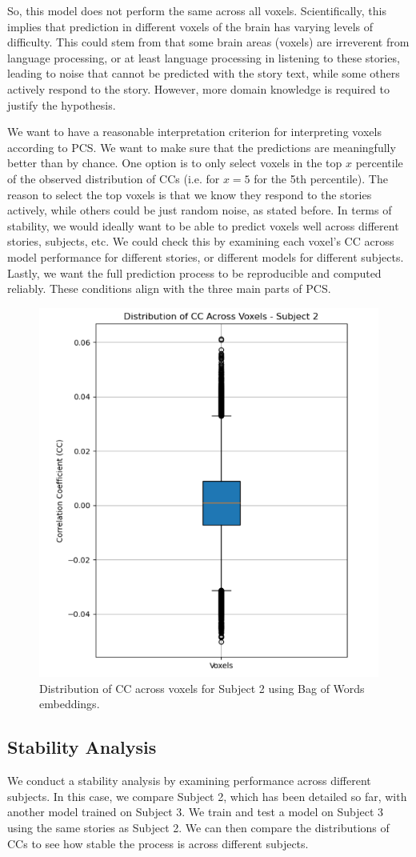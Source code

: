 \documentclass[10pt,letterpaper]{article}
\begin{document}
So, this model does not perform the same across all voxels. Scientifically, this implies that prediction in different voxels of the brain has varying levels of difficulty. This could stem from that some brain areas (voxels) are irreverent from language processing, or at least language processing in listening to these stories, leading to noise that cannot be predicted with the story text, while some others actively respond to the story. However, more domain knowledge is required to justify the hypothesis.

We want to have a reasonable interpretation criterion for interpreting voxels according to PCS. We want to make sure that the predictions are meaningfully better than by chance. One option is to only select voxels in the top \(x\) percentile of the observed distribution of CCs (i.e. for \(x=5\) for the 5th percentile). The reason to select the top voxels is that we know they respond to the stories actively, while others could be just random noise, as stated before. In terms of stability, we would ideally want to be able to predict voxels well across different stories, subjects, etc. We could check this by examining each voxel's CC across model performance for different stories, or different models for different subjects. Lastly, we want the full prediction process to be reproducible and computed reliably. These conditions align with the three main parts of PCS.


\begin{figure}
    \centering
    \includegraphics[width=0.5\linewidth]{figs/cc_dist_voxels_subject_2.png}
    \caption{Distribution of CC across voxels for Subject 2 using Bag of Words embeddings.}
    \label{fig:cc_dist_voxels_subject_2}
\end{figure}


\subsection{Stability Analysis}
We conduct a stability analysis by examining performance across different subjects. In this case, we compare Subject 2, which has been detailed so far, with another model trained on Subject 3. We train and test a model on Subject 3 using the same stories as Subject 2. We can then compare the distributions of CCs to see how stable the process is across different subjects.
\end{document}
